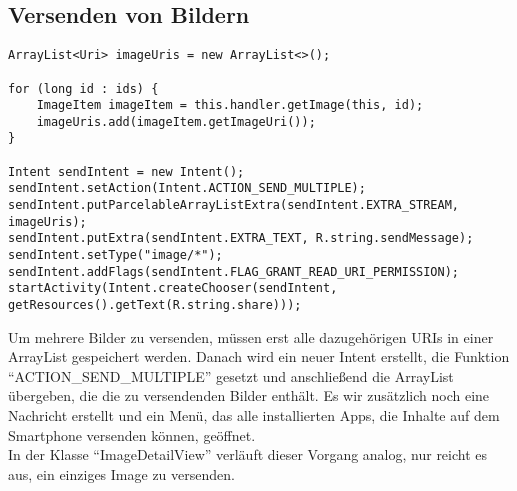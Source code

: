 \subsection{Versenden von Bildern}

\begin{lstlisting}
ArrayList<Uri> imageUris = new ArrayList<>();

for (long id : ids) {
    ImageItem imageItem = this.handler.getImage(this, id);
    imageUris.add(imageItem.getImageUri());
}

Intent sendIntent = new Intent();
sendIntent.setAction(Intent.ACTION_SEND_MULTIPLE);
sendIntent.putParcelableArrayListExtra(sendIntent.EXTRA_STREAM, imageUris);
sendIntent.putExtra(sendIntent.EXTRA_TEXT, R.string.sendMessage);
sendIntent.setType("image/*");
sendIntent.addFlags(sendIntent.FLAG_GRANT_READ_URI_PERMISSION);
startActivity(Intent.createChooser(sendIntent, getResources().getText(R.string.share)));
\end{lstlisting}
Um mehrere Bilder zu versenden, müssen erst alle dazugehörigen URIs in einer ArrayList gespeichert werden. Danach wird ein neuer Intent erstellt, die Funktion \enquote{ACTION\_SEND\_MULTIPLE} gesetzt und anschließend die ArrayList übergeben, die die zu versendenden Bilder enthält. Es wir zusätzlich noch eine Nachricht erstellt und ein Menü, das alle installierten Apps, die Inhalte auf dem Smartphone versenden können, geöffnet.\\
In der Klasse \enquote{ImageDetailView} verläuft dieser Vorgang analog, nur reicht es aus, ein einziges Image zu versenden. 

